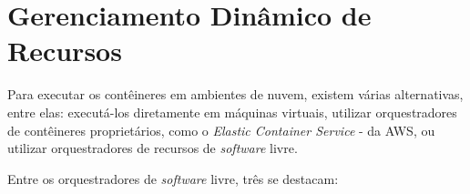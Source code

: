 


\section{Gerenciamento Dinâmico de Recursos}

Para executar os contêineres em ambientes de nuvem, existem várias alternativas, entre elas: executá-los diretamente em máquinas virtuais, utilizar orquestradores de contêineres proprietários, como o \textit{Elastic Container Service} - \cite{awsecs} da AWS, ou utilizar orquestradores de recursos de \textit{software} livre.



Entre os orquestradores de \textit{software} livre, três se destacam:


